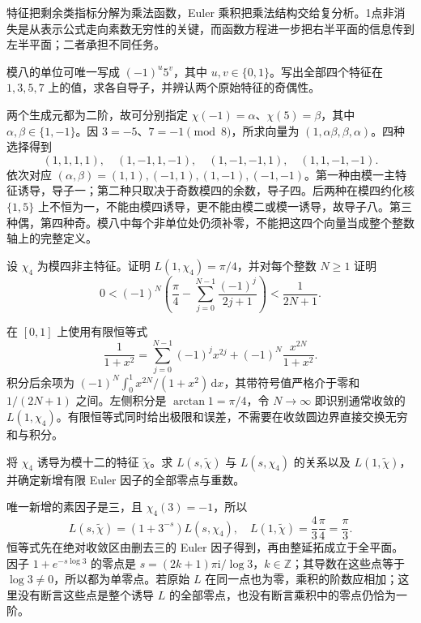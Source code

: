 \begin{chaptersummary}
特征把剩余类指标分解为乘法函数，Euler 乘积把乘法结构交给复分析。1点非消失是从表示公式走向素数无穷性的关键，而函数方程进一步把右半平面的信息传到左半平面；二者承担不同任务。
\end{chaptersummary}
\BookExercises
\begin{exercise}\label{b3:ex:D-1}
模八的单位可唯一写成 \((-1)^u5^v\)，其中 \(u,v\in\{0,1\}\)。写出全部四个特征在 \(1,3,5,7\) 上的值，求各自导子，并辨认两个原始特征的奇偶性。
\end{exercise}
\begin{solution}
两个生成元都为二阶，故可分别指定 \(\chi(-1)=\alpha\)、\(\chi(5)=\beta\)，其中 \(\alpha,\beta\in\{1,-1\}\)。因 \(3=-5\)、\(7=-1\pmod8\)，所求向量为 \((1,\alpha\beta,\beta,\alpha)\)。四种选择得到
\[
 (1,1,1,1),\quad(1,-1,1,-1),\quad
 (1,-1,-1,1),\quad(1,1,-1,-1).
\]
依次对应 \((\alpha,\beta)=(1,1),(-1,1),(1,-1),(-1,-1)\)。第一种由模一主特征诱导，导子一；第二种只取决于奇数模四的余数，导子四。后两种在模四约化核 \(\{1,5\}\) 上不恒为一，不能由模四诱导，更不能由模二或模一诱导，故导子八。第三种偶，第四种奇。模八中每个非单位处仍须补零，不能把这四个向量当成整个整数轴上的完整定义。
\end{solution}

\begin{exercise}\label{b3:ex:D-2}
设 \(\chi_4\) 为模四非主特征。证明 \(L(1,\chi_4)=\pi/4\)，并对每个整数 \(N\ge1\) 证明
\[
 0<(-1)^N\left(\frac\pi4-\sum_{j=0}^{N-1}\frac{(-1)^j}{2j+1}\right)
 <\frac1{2N+1}.
\]
\end{exercise}
\begin{solution}
在 \([0,1]\) 上使用有限恒等式
\[
 \frac1{1+x^2}=\sum_{j=0}^{N-1}(-1)^jx^{2j}
                 +(-1)^N\frac{x^{2N}}{1+x^2}.
\]
积分后余项为 \((-1)^N\int_0^1x^{2N}/(1+x^2)\,\mathrm{d}x\)，其带符号值严格介于零和 \(1/(2N+1)\) 之间。左侧积分是 \(\arctan1=\pi/4\)，令 \(N\to\infty\) 即识别通常收敛的 \(L(1,\chi_4)\)。有限恒等式同时给出极限和误差，不需要在收敛圆边界直接交换无穷和与积分。
\end{solution}

\begin{exercise}\label{b3:ex:D-3}
将 \(\chi_4\) 诱导为模十二的特征 \(\widetilde\chi\)。求 \(L(s,\widetilde\chi)\) 与 \(L(s,\chi_4)\) 的关系以及 \(L(1,\widetilde\chi)\)，并确定新增有限 Euler 因子的全部零点与重数。
\end{exercise}
\begin{solution}
唯一新增的素因子是三，且 \(\chi_4(3)=-1\)，所以
\[
 L(s,\widetilde\chi)=(1+3^{-s})L(s,\chi_4),
 \quad L(1,\widetilde\chi)=\frac43\frac\pi4=\frac\pi3.
\]
恒等式先在绝对收敛区由删去三的 Euler 因子得到，再由整延拓成立于全平面。因子 \(1+e^{-s\log3}\) 的零点是
\(s=(2k+1)\pi\mathrm{i}/\log3\)，\(k\in\mathbb Z\)；其导数在这些点等于 \(\log3\ne0\)，所以都为单零点。若原始 \(L\) 在同一点也为零，乘积的阶数应相加；这里没有断言这些点是整个诱导 \(L\) 的全部零点，也没有断言乘积中的零点仍恰为一阶。
\end{solution}

